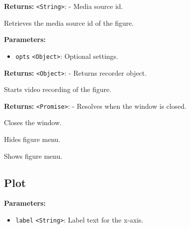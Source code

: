 \documentclass[12pt,a4paper]{article}
\begin{document}
\noindent \textbf{Returns:} \texttt{<String>}: - Media source id.

\noindent Retrieves the media source id of the figure.

\vspace{5mm}
\noindent {}


\noindent \textbf{Parameters:}
\begin{itemize}
  \item \texttt{opts} \texttt{<Object>}: Optional settings.
\end{itemize}

\noindent \textbf{Returns:} \texttt{<Object>}: - Returns recorder object.

\noindent Starts video recording of the figure.

\vspace{5mm}
\noindent {}


\noindent \textbf{Returns:} \texttt{<Promise>}: - Resolves when the window is closed.

\noindent Closes the window.

\vspace{5mm}
\noindent {}


\noindent Hides figure menu.

\vspace{5mm}
\noindent {}


\noindent Shows figure menu.


\subsection{Plot}
\vspace{5mm}
\noindent {}


\noindent \textbf{Parameters:}
\begin{itemize}
  \item \texttt{label} \texttt{<String>}: Label text for the x-axis.
\end{itemize}
\end{document}
